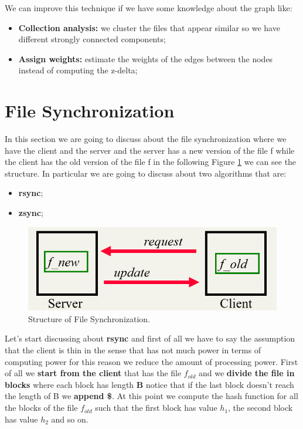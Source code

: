 We can improve this technique if we have some knowledge about the graph like:
\begin{itemize}
    \item \textbf{Collection analysis:} we cluster the files that appear similar so we have different strongly connected components;
    \item \textbf{Assign weights:} estimate the weights of the edges between the nodes instead of computing the z-delta;
\end{itemize}
\section{File Synchronization}
In this section we are going to discuss about the file synchronization where we have the client and the server and the server has a new version of the file f while the client has the old version of the file f in the following Figure \ref{fig:filesync} we can see the structure. In particular we are going to discuss about two algorithms that are:
\begin{itemize}
    \item \textbf{rsync};
    \item \textbf{zsync};
\end{itemize}
\begin{figure}
    \centering
    \includegraphics[width=0.75\linewidth]{images/filesync.PNG}
    \caption{Structure of File Synchronization.}
    \label{fig:filesync}
\end{figure}
Let's start discussing about \textbf{rsync} and first of all we have to say the assumption that the client is thin in the sense that has not much power in terms of computing power for this reason we reduce the amount of processing power.\newline
First of all we \textbf{start from the client} that has the file $f_{old}$ and we \textbf{divide the file in blocks} where each block has length \textbf{B} notice that if the last block doesn't reach the length of B we \textbf{append \$}.\newline
At this point we compute the hash function for all the blocks of the file $f_{old}$ such that the first block has value $h_1$, the second block has value $h_2$ and so on.\newline
